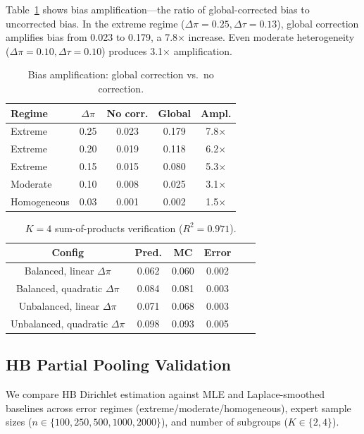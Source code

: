 \documentclass[11pt,a4paper]{article}
\begin{document}
Table~\ref{tab:amplification} shows bias amplification---the ratio of global-corrected bias to uncorrected bias. In the extreme regime ($\Delta\pi = 0.25, \Delta\tau = 0.13$), global correction amplifies bias from 0.023 to 0.179, a 7.8$\times$ increase. Even moderate heterogeneity ($\Delta\pi = 0.10, \Delta\tau = 0.10$) produces 3.1$\times$ amplification.

\begin{table}[t]
\centering
\small
\begin{tabular}{lcccc}
\toprule
Regime & $\Delta\pi$ & No corr. & Global & Ampl. \\
\midrule
Extreme & 0.25 & 0.023 & 0.179 & 7.8$\times$ \\
Extreme & 0.20 & 0.019 & 0.118 & 6.2$\times$ \\
Extreme & 0.15 & 0.015 & 0.080 & 5.3$\times$ \\
Moderate & 0.10 & 0.008 & 0.025 & 3.1$\times$ \\
Homogeneous & 0.03 & 0.001 & 0.002 & 1.5$\times$ \\
\bottomrule
\end{tabular}
\caption{Bias amplification: global correction vs.\ no correction.}
\label{tab:amplification}
\end{table}

\begin{table}[t]
\centering
\small
\begin{tabular}{cccccc}
\toprule
Config & Pred. & MC & Error \\
\midrule
Balanced, linear $\Delta\pi$ & 0.062 & 0.060 & 0.002 \\
Balanced, quadratic $\Delta\pi$ & 0.084 & 0.081 & 0.003 \\
Unbalanced, linear $\Delta\pi$ & 0.071 & 0.068 & 0.003 \\
Unbalanced, quadratic $\Delta\pi$ & 0.098 & 0.093 & 0.005 \\
\bottomrule
\end{tabular}
\caption{$K=4$ sum-of-products verification ($R^2 = 0.971$).}
\label{tab:k4bound}
\end{table}

\subsection{HB Partial Pooling Validation}
\label{sec:hb}

We compare HB Dirichlet estimation against MLE and Laplace-smoothed baselines across error regimes (extreme/moderate/homogeneous), expert sample sizes ($n \in \{100, 250, 500, 1000, 2000\}$), and number of subgroups ($K \in \{2, 4\}$).
\end{document}
